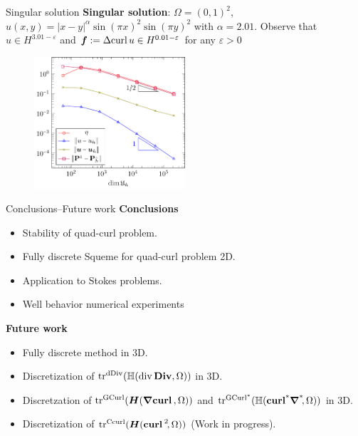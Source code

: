\documentclass[10pt, compress]{beamer}
\begin{document}
\begin{frame}{Singular solution}
    \textbf{Singular solution}: $\Omega=(0,1)^2$, $u(x,y)=|x-y|^\alpha \sin(\pi x)^2\sin(\pi y)^2$ with $\alpha = 2.01$. Observe that $u\in H^{3.01-\varepsilon}$ and $\boldsymbol{f}:=\Delta {\rm curl\,} u \in H^{0.01-\varepsilon}$ for any $\varepsilon>0$
    \begin{figure}
        \centering
        \includegraphics[width=0.5\textwidth]{plots_stokes3.pdf}
        \label{fig:enter-label}
    \end{figure}
\end{frame}
\begin{frame}{Conclusions--Future work}
\textbf{Conclusions}
\begin{itemize}
    \item Stability of quad-curl problem.
    \item Fully discrete Squeme for quad-curl problem 2D.
    \item Application to Stokes problems.
    \item Well behavior numerical experiments

\end{itemize}  
\textbf{Future work}
\begin{itemize}
    \item Fully discrete method in 3D.
    \item Discretization of  $\mathrm{tr}_{}^{\mathrm{dDiv}}({\mathbb{H}({{\rm div\,}{\rm\bf Div\,}\!},\Omega)})$ in 3D.
    \item Discretzation of  $\mathrm{tr}_{}^{\mathrm{GCurl}}({\boldsymbol{H}(\boldsymbol{\nabla}{\bf curl\,},\Omega)})$ and $\mathrm{tr}_{}^{\mathrm{GCurl}^*}({\mathbb{H}(\operatorname{\mathbf{curl^*\!}}\operatorname{\boldsymbol{\nabla^{\textmd{*}}\!}},\Omega)})$ in 3D.
    \item Discretization of $\mathrm{tr}_{}^{\mathrm{Ccurl}}({\boldsymbol{H}(\boldsymbol{{\rm curl\,}}^2\!,\Omega)})$ (Work in progress).
\end{itemize}
\end{frame}
\end{document}
